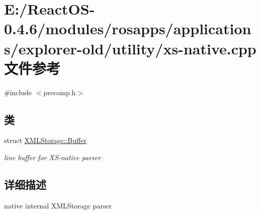 \hypertarget{xs-native_8cpp}{}\section{E\+:/\+React\+O\+S-\/0.4.6/modules/rosapps/applications/explorer-\/old/utility/xs-\/native.cpp 文件参考}
\label{xs-native_8cpp}
{\ttfamily \#include $<$precomp.\+h$>$}\newline
\subsection*{类}
\begin{DoxyCompactItemize}
\item 
struct \hyperlink{struct_x_m_l_storage_1_1_buffer}{X\+M\+L\+Storage\+::\+Buffer}
\begin{DoxyCompactList}\small\item\em line buffer for X\+S-\/native parser \end{DoxyCompactList}\end{DoxyCompactItemize}


\subsection{详细描述}
native internal X\+M\+L\+Storage parser 